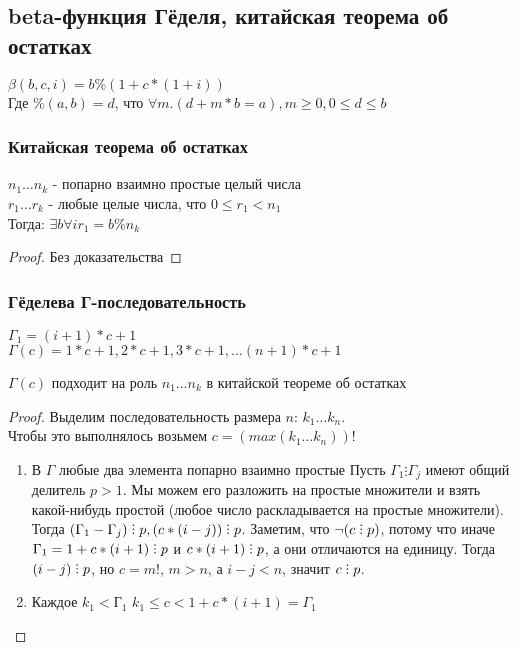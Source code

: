 \subsection{beta-функция Гёделя, китайская теорема об остатках}
\label{sec-11-3}
$\beta(b, c, i) = b \% (1 + c * (1 + i))$\\
Где $\%(a, b) = d$, что $\forall m . (d + m * b = a), m \geq 0, 0 \leq d \leq b$

\subsubsection{Китайская теорема об остатках}
\label{sec-11-3-1}
\begin{theorem}
$n_1\ldots{}n_k$ - попарно взаимно простые целый числа\\
$r_1\ldots{}r_k$ - любые целые числа, что $0 \leq r_1 < n_1$\\
Тогда: $\exists b \forall i  r_1 = b \% n_k$
\end{theorem}
\begin{proof}
Без доказательства
\end{proof}

\subsubsection{Гёделева Г-последовательность}
\label{sec-11-3-2}
$\Gamma_1 = (i + 1) * c + 1$\\
$\Gamma(c) = 1 * c + 1, 2 * c + 1, 3 * c + 1, \ldots (n + 1) * c + 1$
\begin{theorem}
$\Gamma(c)$ подходит на роль $n_1 \ldots n_k$ в китайской теореме об остатках
\end{theorem}
\begin{proof}
Выделим последовательность размера $n$: $k_1 \ldots k_n$.\\
Чтобы это выполнялось возьмем $c = (max(k_1\ldots{}k_n))!$
\begin{enumerate}
\item В $\Gamma$ любые два элемента попарно взаимно простые
\label{sec-11-3-2-1}
Пусть $\Gamma_1 \vdots \Gamma_j$ имеют общий делитель $p > 1$. Мы можем его разложить на простые множители и взять какой-нибудь простой (любое число раскладывается на простые множители).\\
Тогда $(\Gamma_1 - \Gamma_j) \divby p, (c * (i - j)) \divby p$. Заметим, что $\lnot (c \divby p)$, потому что иначе $\Gamma_1 = 1 + c * (i + 1) \divby p$ и $c * (i + 1) \divby p$, а они отличаются на единицу. Тогда $(i - j) \divby p$, но $c = m!$, $m > n$, а $i - j < n$, значит $c \divby p$.
\item Каждое $k_1 < Г_1$
\label{sec-11-3-2-2}
$k_1 \leq c < 1 + c * (i + 1) = \Gamma_1$
\end{enumerate}
\end{proof}
